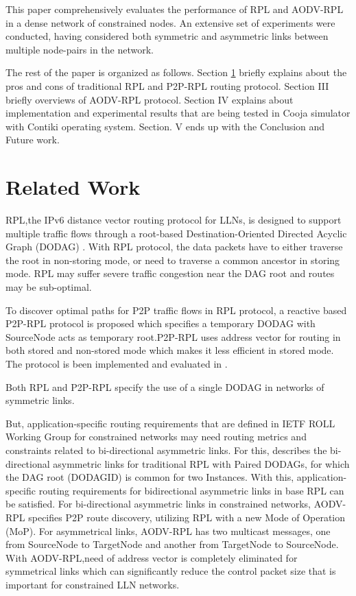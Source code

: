 \documentclass[conference, letterpaper]{IEEEtran}
\begin{document}
This paper comprehensively evaluates the performance of RPL and AODV-RPL in a
dense network of constrained nodes. An extensive set of experiments were
conducted, having considered both symmetric and asymmetric links between
multiple node-pairs in the network. 

The rest of the paper is organized as follows. Section \ref{Section II} briefly
explains about the pros and cons of traditional RPL and P2P-RPL routing
protocol. Section III briefly overviews of AODV-RPL protocol. Section IV
explains about implementation and experimental results that are being tested in
Cooja simulator with Contiki operating system. Section. V ends up with the
Conclusion and Future work.

\section{Related Work}\label{Section II}

RPL,the IPv6 distance vector routing protocol for LLNs, is designed to
support multiple traffic flows through a root-based Destination-Oriented
Directed Acyclic Graph (DODAG) \cite{RFC6550}. With RPL protocol, the data
packets have to either traverse the root in non-storing mode, or need to
traverse a common ancestor in storing mode. RPL may suffer severe traffic
congestion near the DAG root \cite{RFC6997,RFC6998} and routes may be
sub-optimal. 

To discover optimal paths for P2P traffic flows in RPL protocol, a
reactive based P2P-RPL \cite{RFC6997} protocol is proposed which specifies a
temporary DODAG with SourceNode acts as temporary root.P2P-RPL uses address
vector for routing in both stored and non-stored mode which makes it less
efficient in stored mode. The protocol is been implemented and evaluated in
\cite{6064397}.

Both RPL and P2P-RPL specify the use of a single DODAG in networks of symmetric links.

But, application-specific routing requirements that are defined in IETF
ROLL Working Group for constrained networks
\cite{RFC5548,RFC5673,RFC5826,RFC5867} may need routing metrics and constraints
related to bi-directional asymmetric links.  For this, \cite{RFC6549} describes
the bi-directional asymmetric links for traditional RPL with Paired DODAGs, for
which the DAG root (DODAGID) is common for two Instances. With this,
application-specific routing requirements for bidirectional asymmetric links in
base RPL can be satisfied. %
For bi-directional asymmetric links in constrained networks,
AODV-RPL specifies P2P route discovery, utilizing  RPL with a new Mode of
Operation (MoP).  For asymmetrical links, AODV-RPL has two multicast messages,
one from SourceNode to TargetNode and another from TargetNode to SourceNode.
With AODV-RPL,need of address vector is completely eliminated for symmetrical
links which can significantly reduce the control packet size that is important
for constrained LLN networks. 
\end{document}
